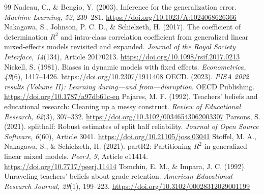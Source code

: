 \begin{thebibliography}{99}
 \color{revised} Nadeau, C., \& Bengio, Y. (2003). Inference for the generalization error. \textit{Machine Learning, 52}, 239--281. \url{https://doi.org/10.1023/A:1024068626366}
 \color{added} Nakagawa, S., Johnson, P. C. D., \& Schielzeth, H. (2017). The coefficient of determination $R^2$ and intra-class correlation coefficient from generalized linear mixed-effects models revisited and expanded. \textit{Journal of the Royal Society Interface, 14}(134), Article 20170213. \url{https://doi.org/10.1098/rsif.2017.0213}
 \color{revised} Nickell, S. (1981). Biases in dynamic models with fixed effects. \textit{Econometrica, 49}(6), 1417--1426. \url{https://doi.org/10.2307/1911408}
 \color{added} OECD. (2023). \textit{PISA 2022 results (Volume II): Learning during---and from---disruption}. OECD Publishing. \url{https://doi.org/10.1787/a97db61c-en}
 \color{revised} Pajares, M. F. (1992). Teachers' beliefs and educational research: Cleaning up a messy construct. \textit{Review of Educational Research, 62}(3), 307--332. \url{https://doi.org/10.3102/00346543062003307}
 \color{added} Parsons, S. (2021). splithalf: Robust estimates of split half reliability. \textit{Journal of Open Source Software, 6}(60), Article 3041. \url{https://doi.org/10.21105/joss.03041}
 \color{added} Stoffel, M. A., Nakagawa, S., \& Schielzeth, H. (2021). partR2: Partitioning $R^2$ in generalized linear mixed models. \textit{PeerJ, 9}, Article e11414. \url{https://doi.org/10.7717/peerj.11414}
 \color{revised} Tomchin, E. M., \& Impara, J. C. (1992). Unraveling teachers' beliefs about grade retention. \textit{American Educational Research Journal, 29}(1), 199--223. \url{https://doi.org/10.3102/00028312029001199}
\end{thebibliography}
